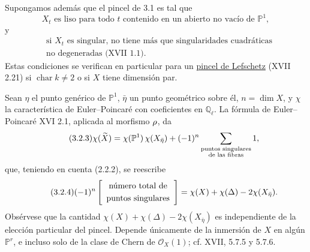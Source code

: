 Supongamos además que el pincel de 3.1 es tal que
\begin{equation}\tag{3.2.1}
X_t\text{ es liso para todo }t\text{ contenido en un abierto no vacío
de }\mathbb P^1,
\end{equation}
y
\begin{equation}\tag{3.2.2}
\begin{aligned}
&\text{si $X_t$ es singular, no tiene más que singularidades cuadráticas}\\
&\text{no degeneradas (XVII 1.1).}
\end{aligned}
\end{equation}
Estas condiciones se verifican en particular para un
\underline{pincel de Lefschetz} (XVII 2.21) si
$\operatorname{char}k\ne2$ o si $X$ tiene dimensión par.

Sean $\eta$ el punto genérico de $\mathbb P^1$, $\bar\eta$ un punto
geométrico sobre él, $n=\dim X$, y $\chi$ la característica de
Euler--Poincaré con coeficientes en $\mathbb Q_\ell$. La fórmula de
Euler--Poincaré XVI 2.1, aplicada al morfismo $\sisi{S}{\rho}$, da
\begin{equation}\tag{3.2.3}
\chi(\widetilde X)
=\chi(\mathbb P^1)\,\chi(X_{\bar\eta})
 +(-1)^{\sisi{\eta}{n}}
\sum_{\substack{\text{puntos singulares}\\
                  \text{de las fibras}}}1,
\end{equation}
que, teniendo en cuenta (2.2.2), se reescribe
\begin{equation}\tag{3.2.4}
(-1)^{\sisi{\eta}{n}}
\left[\begin{array}{c}
\text{número total de}\\[3pt]
\text{puntos singulares}
\end{array}\right]
=\chi(X)+\chi(\Delta)-2\chi(X_{\bar\eta}).
\end{equation}
Obsérvese que la cantidad
$\chi(X)+\chi(\Delta)-2\chi(X_{\bar\eta})$ es independiente de la
elección particular del pincel. Depende únicamente de la inmersión de
$X$ en algún $\mathbb P^r$, e incluso solo de la clase de Chern de
$\mathcal O_X(1)$; cf. XVII, 5.7.5 y 5.7.6.

\pageoriginale

